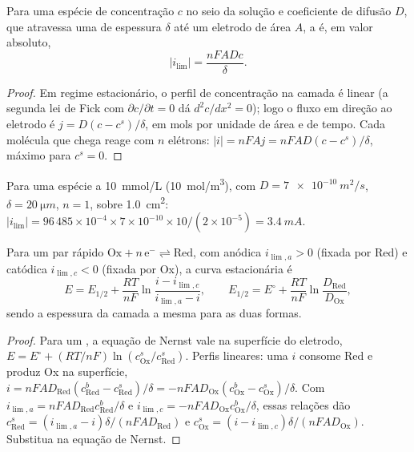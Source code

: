 \begin{theorem}\label{thm:b2:current-potential-curves:limiting}
Para uma espécie de concentração $c$ no seio da solução e coeficiente de
difusão $D$, que atravessa uma  de espessura $\delta$ até
um eletrodo de área $A$, a  é, em valor absoluto,
\[
  |i_{\lim}| = \frac{nFADc}{\delta} .
\]
\end{theorem}

\begin{proof}
Em regime estacionário, o perfil de concentração na camada é linear (a segunda
lei de Fick com $\partial c/\partial t = 0$ dá $d^2c/dx^2 = 0$); logo o fluxo
em direção ao eletrodo é $j = D(c - c^s)/\delta$, em mols por unidade de área e
de tempo. Cada molécula que chega reage com $n$ elétrons: $|i| = nFAj =
nFAD(c - c^s)/\delta$, máximo para $c^s = 0$.
\end{proof}

\begin{example}\label{ex:b2:current-potential-curves:ilim}
Para uma espécie a \qty{10}{mmol/L} (\qty{10}{mol/m^3}), com $D =
\qty{7e-10}{m^2/s}$, $\delta = \qty{20}{\micro m}$, $n = 1$, sobre
\qty{1.0}{cm^2}: $|i_{\lim}| = 96\,485 \times 10^{-4} \times 7 \times 10^{-10}
\times 10/(2 \times 10^{-5}) = \qty{3.4}{mA}$.
\end{example}

\begin{theorem}\label{thm:b2:current-potential-curves:wave}
Para um par rápido $\mathrm{Ox} + n\,\mathrm e^- \rightleftharpoons \mathrm{Red}$,
com  anódica $i_{\lim,a} > 0$ (fixada por Red) e  catódica $i_{\lim,c} < 0$ (fixada por Ox), a curva estacionária é
\[
  E = E_{1/2} + \frac{RT}{nF}\ln\frac{i - i_{\lim,c}}{i_{\lim,a} - i},
  \qquad E_{1/2} = E^\circ + \frac{RT}{nF}\ln\frac{D_{\text{Red}}}{D_{\text{Ox}}} ,
\]
sendo a espessura da camada a mesma para as duas formas.
\end{theorem}

\begin{proof}
Para um , a equação de Nernst vale na superfície do eletrodo, $E = E^\circ + (RT/nF)
\ln(c^s_{\text{Ox}}/c^s_{\text{Red}})$. Perfis lineares: uma  $i$
consome Red e produz Ox na superfície, $i = nFAD_{\text{Red}}(c^b_{\text{Red}}
- c^s_{\text{Red}})/\delta = -nFAD_{\text{Ox}}(c^b_{\text{Ox}} - c^s_{\text{Ox}})/\delta$.
Com $i_{\lim,a} = nFAD_{\text{Red}}c^b_{\text{Red}}/\delta$ e $i_{\lim,c} =
-nFAD_{\text{Ox}}c^b_{\text{Ox}}/\delta$, essas relações dão $c^s_{\text{Red}} = (i_{\lim,a} -
i)\delta/(nFAD_{\text{Red}})$ e $c^s_{\text{Ox}} = (i - i_{\lim,c})\delta/(nFAD_{\text{Ox}})$.
Substitua na equação de Nernst.
\end{proof}

